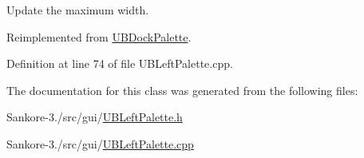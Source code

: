 Update the maximum width. 



Reimplemented from \hyperlink{class_u_b_dock_palette_aaa2875f5907c022762b4cde1ee69e961}{U\-B\-Dock\-Palette}.



Definition at line 74 of file U\-B\-Left\-Palette.\-cpp.



The documentation for this class was generated from the following files\-:\begin{DoxyCompactItemize}
\item 
Sankore-\/3./src/gui/\hyperlink{_u_b_left_palette_8h}{U\-B\-Left\-Palette.\-h}\item 
Sankore-\/3./src/gui/\hyperlink{_u_b_left_palette_8cpp}{U\-B\-Left\-Palette.\-cpp}\end{DoxyCompactItemize}

